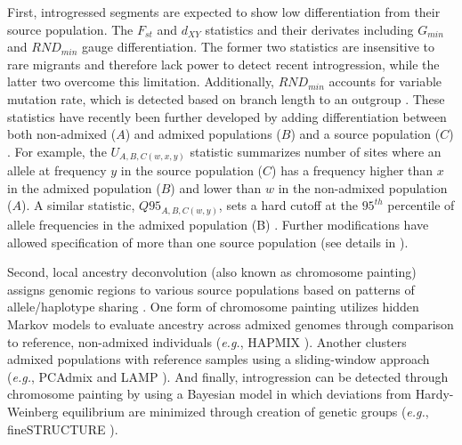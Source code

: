 \documentclass[11pt]{article}
\newcommand{\lwang}[1]{\textcolor{red}{ \emph{\scriptsize  #1}} } %
\newcommand{\gmj}[1]{\textcolor{blue}{ \emph{\scriptsize  #1}} } %
\begin{document}
First, introgressed segments are expected to show low differentiation from their source population.
The $F_{st}$ and $d_{XY}$ statistics and their derivates including $G_{min}$ \cite{geneva2015} and $RND_{min}$\cite{rosenzweig2016} gauge differentiation. 
The former two statistics are insensitive to rare migrants and therefore lack power to detect recent introgression, while the latter two overcome this limitation.
Additionally, $RND_{min}$ accounts for variable mutation rate, which is detected based on branch length to an outgroup \cite{rosenzweig2016}.
These statistics have recently been further developed by adding differentiation between both non-admixed ($A$) and admixed populations ($B$) and a source population ($C$) \cite{racimo2016}. 
For example, the $U_{A,B,C(w,x,y)}$ statistic summarizes number of sites where an allele at frequency $y$ in the source population ($C$) has a frequency higher than $x$ in the admixed population ($B$) and lower than $w$ in the non-admixed population ($A$).
A similar statistic, $Q95_{A,B,C(w,y)}$, sets a hard cutoff at the $95^{th}$ percentile of allele frequencies in the admixed population (B) \cite{racimo2016}.
Further modifications have allowed specification of more than one source population (see details in \cite{racimo2016}).
 
Second, local ancestry deconvolution (also known as chromosome painting) assigns genomic regions to various source populations based on patterns of allele/haplotype sharing \cite{schraiber2015}. 
One form of chromosome painting utilizes hidden Markov models to evaluate ancestry across admixed genomes through comparison to reference, non-admixed individuals (\emph{e.g.}, HAPMIX \cite{Price2009}). 
Another clusters admixed populations with reference samples using a sliding-window approach (\emph{e.g.}, PCAdmix \cite{brisbin2012pcadmix} and LAMP \cite{sankararaman2008}).
And finally, introgression can be detected through chromosome painting by using a Bayesian model \cite{pritchard2000} in which deviations from Hardy-Weinberg equilibrium are minimized through creation of genetic groups (\emph{e.g.}, fineSTRUCTURE \cite{Lawson2012}). 

\end{document}
